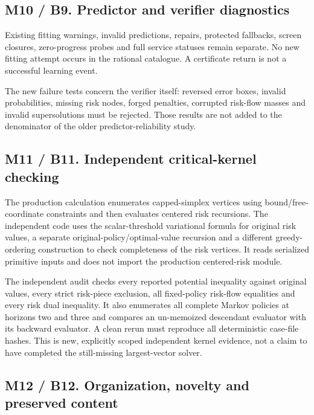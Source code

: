 \hypertarget{m10-b9.-predictor-and-verifier-diagnostics}{%
\subsection{M10 / B9. Predictor and verifier
diagnostics}\label{m10-b9.-predictor-and-verifier-diagnostics}}

Existing fitting warnings, invalid predictions, repairs, protected
fallbacks, screen closures, zero-progress probes and full service
statuses remain separate. No new fitting attempt occurs in the rational
catalogue. A certificate return is not a successful learning event.

The new failure tests concern the verifier itself: reversed error boxes,
invalid probabilities, missing risk nodes, forged penalties, corrupted
risk-flow masses and invalid supersolutions must be rejected. Those
results are not added to the denominator of the older
predictor-reliability study.

\hypertarget{m11-b11.-independent-critical-kernel-checking}{%
\subsection{M11 / B11. Independent critical-kernel
checking}\label{m11-b11.-independent-critical-kernel-checking}}

The production calculation enumerates capped-simplex vertices using
bound/free-coordinate constraints and then evaluates centered risk
recursions. The independent code uses the scalar-threshold variational
formula for original risk values, a separate
original-policy/optimal-value recursion and a different greedy-ordering
construction to check completeness of the risk vertices. It reads
serialized primitive inputs and does not import the production
centered-risk module.

The independent audit checks every reported potential inequality against
original values, every strict risk-piece exclusion, all fixed-policy
risk-flow equalities and every risk dual inequality. It also enumerates
all complete Markov policies at horizons two and three and compares an
un-memoized descendant evaluator with its backward evaluator. A clean
rerun must reproduce all deterministic case-file hashes. This is new,
explicitly scoped independent kernel evidence, not a claim to have
completed the still-missing largest-vector solver.

\hypertarget{m12-b12.-organization-novelty-and-preserved-content}{%
\subsection{M12 / B12. Organization, novelty and preserved
content}\label{m12-b12.-organization-novelty-and-preserved-content}}

